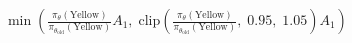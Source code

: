 \documentclass[preview]{standalone}
\begin{document}
\begin{align*}
\min \left( \frac{\pi_\theta(\text{Yellow})}{\pi_{\theta_{\text{old}}}(\text{Yellow})} A_1, \; \text{clip} \left( \frac{\pi_\theta(\text{Yellow})}{\pi_{\theta_{\text{old}}}(\text{Yellow})},\; 0.95,\; 1.05 \right) A_1 \right)
\end{align*}
\end{document}
